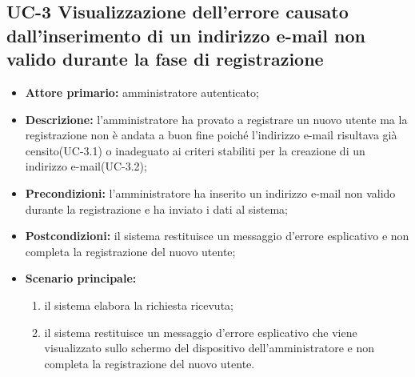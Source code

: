 \subsection{UC-3 Visualizzazione dell'errore causato dall'inserimento di un indirizzo e-mail non valido durante la fase di registrazione}
\begin{itemize}
	\item \textbf{Attore primario:} amministratore autenticato;

	\item \textbf{Descrizione:} l'amministratore ha provato a registrare un nuovo utente ma la registrazione non è andata a buon fine poiché l'indirizzo e-mail risultava già censito(UC-3.1) o inadeguato ai criteri stabiliti per la creazione di un indirizzo e-mail(UC-3.2);

	\item \textbf{Precondizioni:} l'amministratore ha inserito un indirizzo e-mail non valido durante la registrazione e ha inviato i dati al sistema;

	\item \textbf{Postcondizioni:} il sistema restituisce un messaggio d'errore esplicativo e non completa la registrazione del nuovo utente;

	\item \textbf{Scenario principale:}
	      \begin{enumerate}
		      \item il sistema elabora la richiesta ricevuta;
		      \item il sistema restituisce un messaggio d'errore esplicativo che viene visualizzato sullo schermo del dispositivo dell'amministratore e non completa la registrazione del nuovo utente.
	      \end{enumerate}
\end{itemize}

